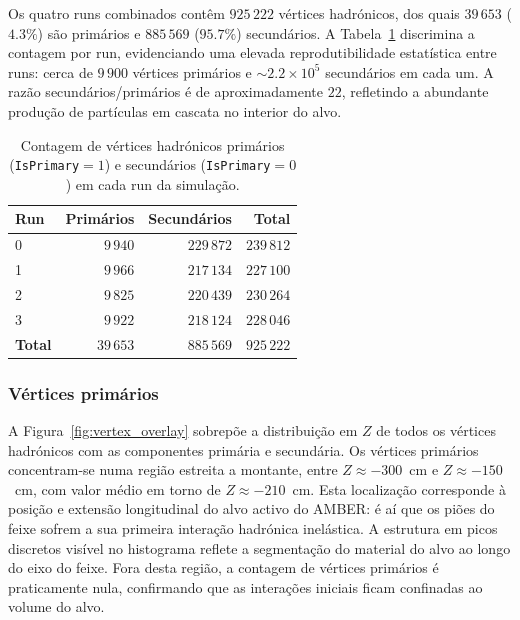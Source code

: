 \documentclass[12pt,a4paper]{article}
\begin{document}
Os quatro runs combinados contêm $925\,222$ vértices hadrónicos, dos quais
$39\,653$ ($4.3\%$) são primários e $885\,569$ ($95.7\%$) secundários. A
Tabela~\ref{tab:vertex_contagem} discrimina a contagem por run, evidenciando uma
elevada reprodutibilidade estatística entre runs: cerca de $9\,900$ vértices
primários e $\sim 2.2 \times 10^5$ secundários em cada um. A razão
secundários/primários é de aproximadamente $22$, refletindo a abundante
produção de partículas em cascata no interior do alvo.

\begin{table}[H]
  \centering
  \caption{Contagem de vértices hadrónicos primários (\texttt{IsPrimary}$=1$) e
    secundários (\texttt{IsPrimary}$=0$) em cada run da simulação.}
  \label{tab:vertex_contagem}
  \begin{tabular}{lrrr}
    \toprule
    \textbf{Run} & \textbf{Primários} & \textbf{Secundários} & \textbf{Total} \\
    \midrule
    0      & $9\,940$  & $229\,872$ & $239\,812$ \\
    1      & $9\,966$  & $217\,134$ & $227\,100$ \\
    2      & $9\,825$  & $220\,439$ & $230\,264$ \\
    3      & $9\,922$  & $218\,124$ & $228\,046$ \\
    \midrule
    \textbf{Total} & $39\,653$ & $885\,569$ & $925\,222$ \\
    \bottomrule
  \end{tabular}
\end{table}

\subsubsection{Vértices primários}

A Figura~\ref{fig:vertex_overlay} sobrepõe a distribuição em $Z$ de todos os
vértices hadrónicos com as componentes primária e secundária. Os vértices
primários concentram-se numa região estreita a montante, entre
$Z \approx -300$~cm e $Z \approx -150$~cm, com valor médio em torno de
$Z \approx -210$~cm. Esta localização corresponde à posição e extensão
longitudinal do alvo activo do AMBER: é aí que os piões do feixe sofrem a sua
primeira interação hadrónica inelástica. A estrutura em picos discretos visível
no histograma reflete a segmentação do material do alvo ao longo do eixo do
feixe. Fora desta região, a contagem de vértices primários é praticamente nula,
confirmando que as interações iniciais ficam confinadas ao volume do alvo.
\end{document}

